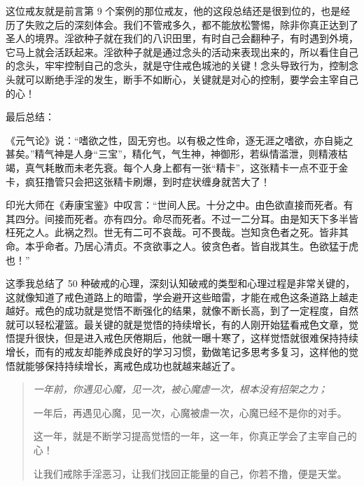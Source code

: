 这位戒友就是前言第 9 个案例的那位戒友，他的这段总结还是很到位的，也是经历了失败之后的深刻体会。我们不管戒多久，都不能放松警惕，除非你真正达到了圣人的境界。淫欲种子就在我们的八识田里，有时自己会翻种子，有时遇到外境，它马上就会活跃起来。淫欲种子就是通过念头的活动来表现出来的，所以看住自己的念头，牢牢控制自己的念头，就是守住戒色城池的关键！念头导致行为，控制念头就可以断绝手淫的发生，断手不如断心，关键就是对心的控制，要学会主宰自己的心！

最后总结：

《元气论》说：“嗜欲之性，固无穷也。以有极之性命，逐无涯之嗜欲，亦自毙之甚矣。”精气神是人身“三宝”，精化气，气生神，神御形，若纵情滥泄，则精液枯竭，真气耗散而未老先衰。每个人身上都有一张“精卡”，这张精卡一点不亚于金卡，疯狂撸管只会把这张精卡刷爆，到时症状缠身就苦大了！

印光大师在《寿康宝鉴》中叹言：“世间人民。十分之中。由色欲直接而死者。有其四分。间接而死者。亦有四分。命尽而死者。不过一二分耳。由是知天下多半皆枉死之人。此祸之烈。世无有二可不哀哉。可不畏哉。岂知贪色者之死。皆非其命。本乎命者。乃居心清贞。不贪欲事之人。彼贪色者。皆自戕其生。色欲猛于虎也！”

这季我总结了 50 种破戒的心理，深刻认知破戒的类型和心理过程是非常关键的，这就像知道了戒色道路上的暗雷，学会避开这些暗雷，才能在戒色这条道路上越走越好。戒色的成功就是觉悟不断强化的结果，就像不断长高，到了一定程度，自然就可以轻松灌篮。最关键的就是觉悟的持续增长，有的人刚开始猛看戒色文章，觉悟提升很快，但是进入戒色厌倦期后，他就一曝十寒了，这样觉悟就很难保持持续增长，而有的戒友却能养成良好的学习习惯，勤做笔记多思考多复习，这样他的觉悟就能够保持持续增长，离戒色成功也就越来越近了。

\begin{quotation}\it
    一年前，你遇见心魔，见一次，被心魔虐一次，根本没有招架之力；

    一年后，再遇见心魔，见一次，心魔被虐一次，心魔已经不是你的对手。

    这一年，就是不断学习提高觉悟的一年，这一年，你真正学会了主宰自己的心！

    让我们戒除手淫恶习，让我们找回正能量的自己，你若不撸，便是天堂。
\end{quotation}
